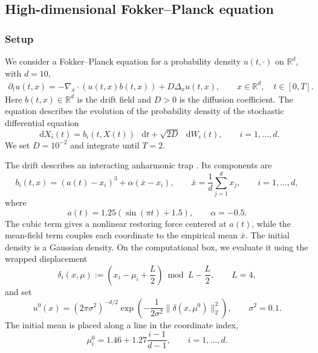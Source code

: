 \documentclass[oneside,11pt]{article}
\theoremstyle{remark}
\theoremstyle{thmstyleone}
\theoremstyle{thmstylethree}
\theoremstyle{thmstyletwo}
\newcommand{\R}{\mathbb{R}}
\newcommand{\norm}[1]{\lVert #1\rVert}
\newcommand*\dif{\mathop{}\!\mathrm{d}}
\begin{document}
\subsection{High-dimensional Fokker--Planck equation}
\label{sec:numexp_fokker_planck}

\subsubsection{Setup}
We consider a Fokker--Planck equation for a probability density
$u(t,\cdot)$ on $\R^d$, with $d=10$,
\begin{equation}
    \begin{aligned}
        \partial_t u(t,x) =
        -\nabla_x\cdot\left(u(t,x)b(t,x)\right)
        +
        D\Delta_x u(t,x),
        \qquad
        x\in\R^d,
        \quad
        t\in[0,T].
    \end{aligned}
    \label{eq:NumExp:FokkerPlanck}
\end{equation}
Here $b(t,x)\in\R^d$ is the drift field and $D>0$ is the diffusion coefficient. The equation describes the evolution of the probability density of the
stochastic differential equation
\begin{equation}
    \dif X_i(t)
    =
    b_i(t,X(t))\,\dif t
    +
    \sqrt{2D}\,\dif W_i(t),
    \qquad
    i=1,\ldots,d.
    \label{eq:fpe_sde}
\end{equation}
We set $D=10^{-2}$ and integrate until $T=2$.

The drift describes an interacting anharmonic trap \cite{bruna_neural_2024}. Its
components are
\begin{equation*}
    b_i(t,x)
    =
    (a(t)-x_i)^3+\alpha(\bar x-x_i),
    \qquad
    \bar x=\frac1d\sum_{j=1}^d x_j,
    \qquad
    i=1,\ldots,d,
\end{equation*}
where
\begin{equation*}
    a(t)=1.25(\sin(\pi t)+1.5),
    \qquad
    \alpha=-0.5.
\end{equation*}
The cubic term gives a nonlinear restoring force centered at $a(t)$, while the mean-field term couples each coordinate to the empirical mean $\bar x$. The initial density is a Gaussian density. On the computational box, we evaluate
it using the wrapped displacement
\begin{equation*}
    \delta_i(x,\mu)
    :=
    \left(x_i-\mu_i+\frac{L}{2}\right)\bmod L-\frac{L}{2},
    \qquad
    L=4,
\end{equation*}
and set
\begin{equation*}
    u^0(x)
    =
    (2\pi\sigma^2)^{-d/2}
    \exp\left(
    -\frac{1}{2\sigma^2}
    \norm{\delta(x,\mu^0)}_2^2
    \right),
    \qquad
    \sigma^2=0.1.
\end{equation*}
The initial mean is placed along a line in the coordinate index,
\begin{equation*}
    \mu_i^0
    =
    1.46+1.27\frac{i-1}{d-1},
    \qquad
    i=1,\ldots,d.
\end{equation*}
\end{document}
